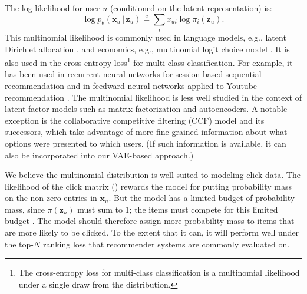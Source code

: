 \documentclass[sigconf]{acmart}
\newcommand{\mathbold}[1]{\ensuremath{\boldsymbol{\mathbf{#1}}}}
\newcommand{\mbx}{\mathbold{x}}
\newcommand{\mbz}{\mathbold{z}}
\newcommand{\g}{\,\vert\,}
\begin{document}
The log-likelihood for user $u$ (conditioned on the latent representation) is: 
\begin{equation}\label{eq:multi}
\log p_\theta(\mbx_u \g \mbz_u) \overset{c}{=} \sum_i x_{ui} \log \pi_i(\mbz_u).
\end{equation}
This multinomial likelihood is commonly used in language models, e.g., latent Dirichlet 
allocation \citep{blei2003latent}, and economics, e.g., multinomial logit choice model \citep{mcfadden1973conditional}. 
It is also used in the cross-entropy loss\footnote{The cross-entropy loss for multi-class classification 
is a multinomial likelihood under a single draw from the distribution.} for multi-class classification. For example, it has been used in recurrent neural networks for 
session-based sequential recommendation \citep{hidasi2015session,tan2016improved,smirnova2017contextual,hidasi2017recurrent,chatzis2017recurrent} and 
in feedward neural networks applied to Youtube recommendation \citep{covington2016deep}. 
The multinomial likelihood is less well studied in the context of latent-factor models such as matrix factorization and autoencoders.
A notable exception is the collaborative competitive filtering (CCF) model \citep{yang2011collaborative} and its successors,
which take advantage of more fine-grained information about what options were presented to which users.
(If such information is available, it can also be incorporated into our \gls{VAE}-based approach.)

We believe the multinomial distribution is well suited to modeling click data.
The likelihood of the click matrix () rewards the model for putting probability mass on the non-zero entries in $\mbx_u$.
But the model has a limited budget of probability mass, since $\pi(\mbz_u)$ must sum to 1;
the items must compete for this limited budget \citep{yang2011collaborative}.
The model should therefore assign more probability mass to items that are more likely to be clicked.
To the extent that it can, it will perform well under the top-$N$ ranking loss that recommender systems are commonly evaluated on.
\end{document}
